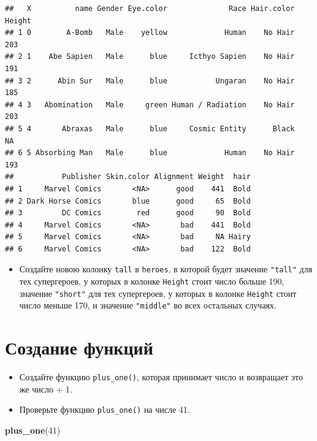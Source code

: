 \documentclass[]{book}
\newenvironment{Shaded}{\begin{snugshade}}{\end{snugshade}}
\newcommand{\KeywordTok}[1]{\textcolor[rgb]{0.13,0.29,0.53}{\textbf{#1}}}
\newcommand{\DecValTok}[1]{\textcolor[rgb]{0.00,0.00,0.81}{#1}}
\newcommand{\NormalTok}[1]{#1}
\providecommand{\tightlist}{%
  \setlength{\itemsep}{0pt}\setlength{\parskip}{0pt}}
\begin{document}
\begin{verbatim}
##   X          name Gender Eye.color              Race Hair.color Height
## 1 0        A-Bomb   Male    yellow             Human    No Hair    203
## 2 1    Abe Sapien   Male      blue     Icthyo Sapien    No Hair    191
## 3 2      Abin Sur   Male      blue           Ungaran    No Hair    185
## 4 3   Abomination   Male     green Human / Radiation    No Hair    203
## 5 4       Abraxas   Male      blue     Cosmic Entity      Black     NA
## 6 5 Absorbing Man   Male      blue             Human    No Hair    193
##           Publisher Skin.color Alignment Weight  hair
## 1     Marvel Comics       <NA>      good    441  Bold
## 2 Dark Horse Comics       blue      good     65  Bold
## 3         DC Comics        red      good     90  Bold
## 4     Marvel Comics       <NA>       bad    441  Bold
## 5     Marvel Comics       <NA>       bad     NA Hairy
## 6     Marvel Comics       <NA>       bad    122  Bold
\end{verbatim}

\begin{itemize}
\tightlist
\item
  Создайте новою колонку \texttt{tall} в \texttt{heroes}, в которой
  будет значение \texttt{"tall"} для тех супергероев, у которых в
  колонке \texttt{Height} стоит число больше 190, значение
  \texttt{"short"} для тех супергероев, у которых в колонке
  \texttt{Height} стоит число меньше 170, и значение \texttt{"middle"}
  во всех остальных случаях.
\end{itemize}

\section{Создание функций}\label{task_function}

\begin{itemize}
\item
  Создайте функцию \texttt{plus\_one()}, которая принимает число и
  возвращает это же число + 1.
\item
  Проверьте функцию \texttt{plus\_one()} на числе 41.
\end{itemize}

\begin{Shaded}
\begin{Highlighting}[]
\KeywordTok{plus_one}\NormalTok{(}\DecValTok{41}\NormalTok{)}
\end{Highlighting}
\end{Shaded}
\end{document}
